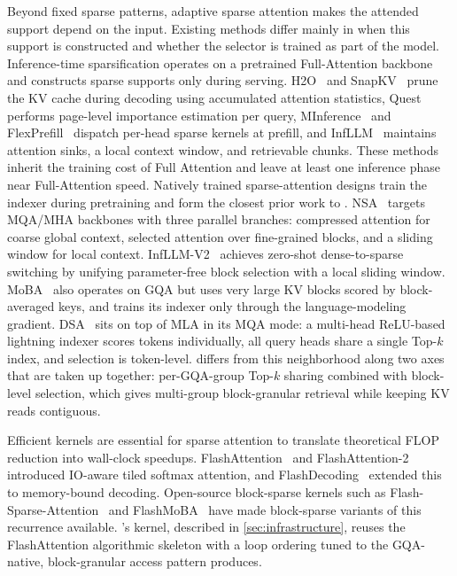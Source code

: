 Beyond fixed sparse patterns, adaptive sparse attention makes the attended support depend on the input. 
Existing methods differ mainly in when this support is constructed and whether the selector is trained as part of the model. 
Inference-time sparsification operates on a pretrained Full-Attention backbone and constructs sparse supports only during serving. H2O~\citep{zhang2023h2o} and SnapKV~\citep{li2024snapkv} prune the KV cache during decoding using accumulated attention statistics, Quest~\citep{tang2024quest} performs page-level importance estimation per query, MInference~\citep{jiang2024minference} and FlexPrefill~\citep{lai2025flexprefill} dispatch per-head sparse kernels at prefill, and InfLLM~\citep{xiao2024infllm} maintains attention sinks, a local context window, and retrievable chunks. These methods inherit the training cost of Full Attention and leave at least one inference phase near Full-Attention speed. Natively trained sparse-attention designs train the indexer during pretraining and form the closest prior work to \method{}. NSA~\citep{yuan2025nsa} targets MQA/MHA backbones with three parallel branches: compressed attention for coarse global context, selected attention over fine-grained blocks, and a sliding window for local context. InfLLM-V2~\citep{zhao2025infllmv2} achieves zero-shot dense-to-sparse switching by unifying parameter-free block selection with a local sliding window. MoBA~\citep{lu2025mobamixtureblockattention} also operates on GQA but uses very large KV blocks scored by block-averaged keys, and trains its indexer only through the language-modeling gradient. DSA~\citep{deepseekai2025deepseekv32pushingfrontieropen} sits on top of MLA in its MQA mode: a multi-head ReLU-based lightning indexer scores tokens individually, all query heads share a single Top-$k$ index, and selection is token-level.
\method{} differs from this neighborhood along two axes that are taken up together: per-GQA-group Top-$k$ sharing combined with block-level selection, which gives multi-group block-granular retrieval while keeping KV reads contiguous.

Efficient kernels are essential for sparse attention to translate theoretical FLOP reduction into wall-clock speedups. FlashAttention~\citep{dao2022flashattention} and FlashAttention-2~\citep{dao2023flashattention2} introduced IO-aware tiled softmax attention, and FlashDecoding~\citep{dao2023flashdecoding} extended this to memory-bound decoding. Open-source block-sparse kernels such as Flash-Sparse-Attention~\citep{yan2025fsa} and FlashMoBA~\citep{xiao2025flashmoba} have made block-sparse variants of this recurrence available. \method{}'s kernel, described in \cref{sec:infrastructure}, reuses the FlashAttention algorithmic skeleton with a loop ordering tuned to the GQA-native, block-granular access pattern \method{} produces.
